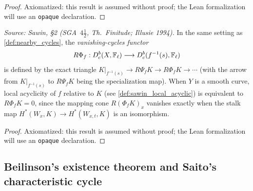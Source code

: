 \begin{proof}
  Axiomatized: this result is assumed without proof; the Lean formalization will use
  an \texttt{opaque} declaration.
\end{proof}

\begin{definition}
  \label{def:vanishing_cycles}
  \textit{Source: Sawin, §2 (SGA~$4\tfrac{1}{2}$, Th.\ Finitude; Illusie 1994).}
  In the same setting as \cref{def:nearby_cycles}, the \emph{vanishing-cycles
  functor}
  \[ R\Phi_f : D^b_c(X,\mathbb{F}_\ell) \longrightarrow D^b_c(f^{-1}(s),\mathbb{F}_\ell) \]
  is defined by the exact triangle $K|_{f^{-1}(s)} \to R\Psi_f K \to R\Phi_f K \to
  \cdots$ (with the arrow from $K|_{f^{-1}(s)}$ to $R\Psi_f K$ being the
  specialization map).  When $Y$ is a smooth curve, local acyclicity of $f$ relative
  to $K$ (see \cref{def:sawin_local_acyclic}) is equivalent to $R\Phi_f K = 0$, since
  the mapping cone $R(\Phi_f K)_x$ vanishes exactly when the stalk map
  $H^*(W_x,K)\to H^*(W_{x,t},K)$ is an isomorphism.
\end{definition}

\begin{proof}
  Axiomatized: this result is assumed without proof; the Lean formalization will use
  an \texttt{opaque} declaration.
\end{proof}

\subsection{Beilinson's existence theorem and Saito's characteristic cycle}


